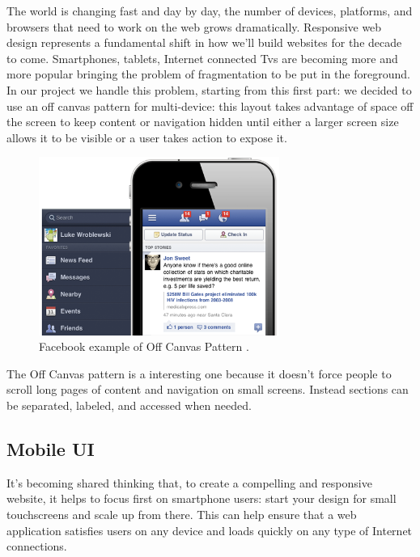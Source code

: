 \documentclass[a4paper,13pt]{report}
\begin{document}
The world is changing fast and day by day, the number of devices, platforms, and browsers that need to work on the web grows dramatically. Responsive web design represents a fundamental shift in how we'll build websites for the decade to come.
Smartphones, tablets, Internet connected Tvs are becoming more and more popular bringing the problem of fragmentation to be put in the foreground.
In our project we handle this problem, starting from this first part: we decided to use an off canvas pattern for multi-device: this layout takes advantage of space off the screen to keep content or navigation hidden until either a larger screen size allows it to be visible or a user takes action to expose it.
\\[0.2cm]
\begin{figure}[H]
  \caption{Facebook example of Off Canvas Pattern .}
  \centering
    \includegraphics[width=0.7\textwidth]{pics/UISketches/offCanvas}
\end{figure}

The Off Canvas pattern is a interesting one because it doesn't force people to scroll long pages of content and navigation on small screens. Instead sections can be separated, labeled, and accessed when needed.


\subsection {Mobile UI}
It's becoming shared thinking that, to create a compelling and responsive website, it helps to focus first on smartphone users: start your design for small touchscreens and scale up from there. This can help ensure that a web application satisfies users on any device and loads quickly on any type of Internet connections.

\end{document}
